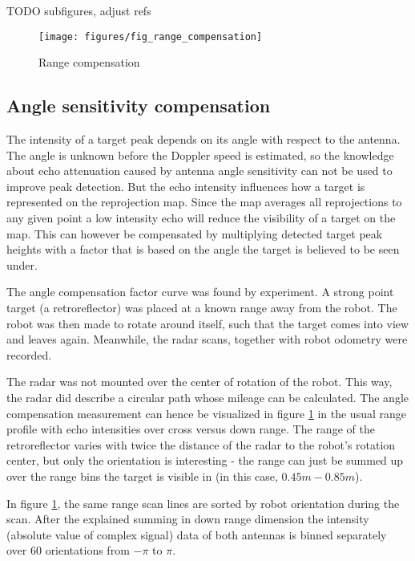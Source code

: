 TODO subfigures, adjust refs
\begin{figure}[htbp]
    \centering
    \texttt{[image: figures/fig\_range\_compensation]}
    \caption{Range compensation}
    \label{fig:fig_range_compensation}
\end{figure}

\subsection{Angle sensitivity compensation}\label{angle-sensitivity-compensation}

The intensity of a target peak depends on its angle with respect to the
antenna. The angle is unknown before the Doppler speed is estimated, so
the knowledge about echo attenuation caused by antenna angle sensitivity
can not be used to improve peak detection. But the echo intensity
influences how a target is represented on the reprojection map. Since
the map averages all reprojections to any given point a low intensity
echo will reduce the visibility of a target on the map. This can however
be compensated by multiplying detected target peak heights with a factor
that is based on the angle the target is believed to be seen under.

The angle compensation factor curve was found by experiment. A strong
point target (a retroreflector) was placed at a known range away from
the robot. The robot was then made to rotate around itself, such that
the target comes into view and leaves again. Meanwhile, the radar scans,
together with robot odometry were recorded.

The radar was not mounted over the center of rotation of the robot. This
way, the radar did describe a circular path whose mileage can be
calculated. The angle compensation measurement can hence be visualized
in figure \cref{fig:fig_range_compensation} in the usual range profile with echo intensities over
cross versus down range. The range of the retroreflector varies with
twice the distance of the radar to the robot's rotation center, but only
the orientation is interesting - the range can just be summed up over
the range bins the target is visible in (in this case,
\(0.45m - 0.85m\)).

In figure \cref{fig:fig_range_compensation}, the same range scan lines are sorted by robot
orientation during the scan. After the explained summing in down range
dimension the intensity (absolute value of complex signal) data of both
antennas is binned separately over 60 orientations from \(-\pi\) to
\(\pi\).

